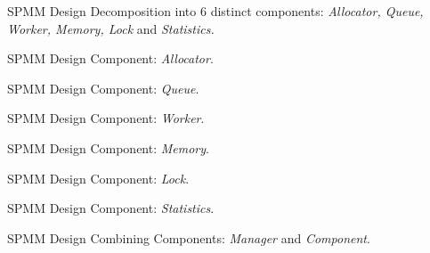 \begin{frame}{SPMM Design}
  Decomposition into 6 distinct components:
  \newline
  \centering
  \emph{Allocator, Queue, Worker, Memory, Lock} and \emph{Statistics.}
\end{frame}

\begin{frame}[t]{SPMM Design}
  Component: \emph{Allocator}.
  \begin{figure}
    \centering
    
  \end{figure}
\end{frame}

\begin{frame}[t]{SPMM Design}
  Component: \emph{Queue}.
  \begin{figure}
    \centering
    
  \end{figure}
\end{frame}

\begin{frame}[t]{SPMM Design}
  Component: \emph{Worker}.
  \begin{figure}
    \centering
    
  \end{figure}
\end{frame}

\begin{frame}[t]{SPMM Design}
  Component: \emph{Memory}.
  \begin{figure}
    \centering
    
  \end{figure}
\end{frame}

\begin{frame}[t]{SPMM Design}
  Component: \emph{Lock}.
  \begin{figure}
    \centering
    
  \end{figure}
\end{frame}

\begin{frame}[t]{SPMM Design}
  Component: \emph{Statistics}.
  \begin{figure}
    \centering
    
  \end{figure}
\end{frame}

\begin{frame}[t]{SPMM Design}
  Combining Components: \emph{Manager} and \emph{Component}.
  \pause
  \vspace*{0.5cm}
  \begin{figure}
    \centering
    
  \end{figure}
\end{frame}
